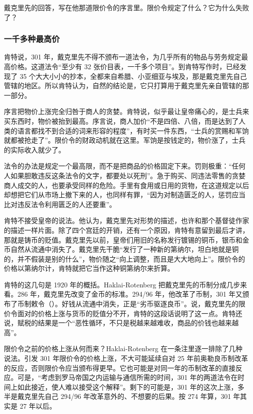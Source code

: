 戴克里先的回答，写在他那道限价令的序言里。限价令规定了什么？它为什么失败了？

\subsubsection{一千多种最高价}
肯特说，301 年，戴克里先不得不颁布一道法令，为几乎所有的物品与劳务规定最高价格。这道法令“至少有 32 张价目表，一千多个项目”。到肯特写作时，已经发现了 35 个大大小小的抄本，全都来自希腊、小亚细亚与埃及，那是戴克里先自己管辖的地区。所以肯特认为，自然的结论是，它只打算用于戴克里先亲自管辖的那一部分\cite{kent1920}。

序言把物价上涨完全归咎于商人的贪婪。肯特说，似乎最让皇帝痛心的，是士兵来买东西时，物价被抬到最高\cite{kent1920}。序言说，商人加价“不是四倍、八倍，而是达到了人类的语言都找不到合适的词来形容的程度”，有时买一件东西，“士兵的赏赐和军饷就都被抢走了”\cite{kent1920}。限价令的财政动机就在这里。军饷是按钱定的，物价涨了，士兵的实际收入就少了。

法令的办法是规定一个最高限，而不是把商品的价格固定下来。罚则极重：“任何人如果胆敢违反这条法令的文字，都要处以死刑”。急于购买、同违法零售的贪婪商人成交的人，也要承受同样的危险。手里有食用或日用的货物，在这道规定以后却想把它们从市场上撤下来的人，也同样有罪，“因为对制造匮乏的人，惩罚应当比对违反法令利用匮乏的人还要重”\cite{kent1920}。

肯特不接受皇帝的说法。他认为，戴克里先对形势的描述，也许和那个基督徒作家的描述一样片面。除了四个宫廷的开销，还有一个原因，肯特有意留到最后才讲，那就是铸币的贬值。戴克里先以前，皇帝们用旧的名称发行镀锡的铜币，银币和金币自然从流通中消失了。戴克里先干脆“发行了一种新的第纳尔，坦白地就是铜的，并不假装是别的什么”，物价随之“向上调整，而且是大大地向上”\cite{kent1920}。限价令的价格以第纳尔计，肯特就把它当作这种铜第纳尔来折算。

肯特的这几句是 1920 年的概括。Haklai-Rotenberg 把戴克里先的币制分成几步来看。286 年，戴克里先改变了金币的标准。294/96 年，他改革了币制，301 年又颁布了币制敕令（）。好钱从流通中消失，正是“劣币驱逐良币”。说，戴克里先的限价令面对的价格上涨与货币的贬值分不开，肯特的这段话说明了这一点。肯特还说，赋税的结果是一个“恶性循环，不只是税越来越难收，商品的价钱也越来越高”\cite{kent1920}。

限价令之前的价格上涨从何而来？Haklai-Rotenberg 在一条注里逐一排除了几种说法。引发 301 年限价令的价格上涨，不大可能延续自对 25 年前奥勒良币制改革的反应，否则限价令应当颁布得更早。它也可能是对同一年的币制改革的直接反应。可是，“考虑到罗马帝国之内运输与通信所需的时间，301 年的两道法令在时间上如此接近，使人难以接受这个解释”。剩下的可能是，301 年的这次上涨，多半是戴克里先自己 294/96 年改革意外的、不想要的后果\cite{haklai2011}。按 274 年算，301 年其实是 27 年以后。

